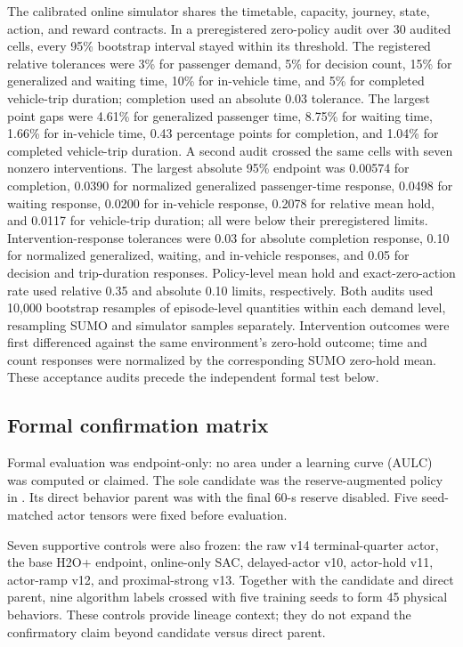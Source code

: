 The calibrated online simulator shares the timetable, capacity, journey,
state, action, and reward contracts. In a preregistered zero-policy audit over
30 audited cells, every 95\% bootstrap interval stayed within its threshold.
The registered relative tolerances were 3\% for passenger demand, 5\% for
decision count, 15\% for generalized and waiting time, 10\% for in-vehicle
time, and 5\% for completed vehicle-trip duration; completion used an absolute
0.03 tolerance.
The largest point gaps were 4.61\% for generalized passenger time, 8.75\% for
waiting time, 1.66\% for in-vehicle time, 0.43 percentage points for
completion, and 1.04\% for completed vehicle-trip duration. A second audit
crossed the same cells with seven nonzero interventions. The largest absolute
95\% endpoint was 0.00574 for completion, 0.0390 for normalized generalized
passenger-time response, 0.0498 for waiting response, 0.0200 for in-vehicle
response, 0.2078 for relative mean hold, and 0.0117 for vehicle-trip duration;
all were below their preregistered limits. Intervention-response tolerances
were 0.03 for absolute completion response, 0.10 for normalized generalized,
waiting, and in-vehicle responses, and 0.05 for decision and trip-duration
responses. Policy-level mean hold and exact-zero-action rate used relative
0.35 and absolute 0.10 limits, respectively. Both audits used 10,000 bootstrap
resamples of episode-level quantities within each demand level, resampling
SUMO and simulator samples separately. Intervention outcomes were first
differenced against the same environment's zero-hold outcome; time and count
responses were normalized by the corresponding SUMO zero-hold mean. These
acceptance audits precede the independent formal test below.

\subsection{Formal confirmation matrix}
\label{sec:exp:formal_design}

Formal evaluation was endpoint-only: no area under a learning curve (AULC) was
computed or claimed. The sole candidate was the reserve-augmented policy in
. Its direct behavior parent was
 with the final 60-s reserve disabled. Five
seed-matched actor tensors were fixed before evaluation.

Seven supportive controls were also frozen: the raw v14 terminal-quarter
actor, the base H2O+ endpoint, online-only SAC, delayed-actor v10, actor-hold
v11, actor-ramp v12, and proximal-strong v13. Together with the candidate and
direct parent, nine algorithm labels crossed with five training seeds to form
45 physical behaviors. These controls provide lineage context; they do not
expand the confirmatory claim beyond candidate versus direct parent.

